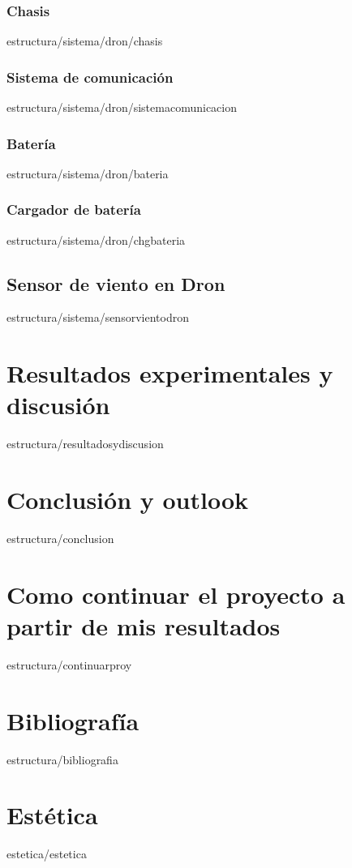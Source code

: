 \documentclass[epsbased,copyright,final,printable,covers,extendedindex,firstnumbered,tfg,gnuplot]{tfgtfmthesisuam}
\begin{document}
		\subsection{Chasis\label{SS:CHASIS}}{estructura/sistema/dron/chasis}
		\subsection{Sistema de comunicación\label{SS:SISTCOMUNICACION}}{estructura/sistema/dron/sistemacomunicacion}
		\subsection{Batería\label{SS:BATERIA}}{estructura/sistema/dron/bateria}
		\subsection{Cargador de batería\label{SS:CHGBATERIA}}{estructura/sistema/dron/chgbateria}
	\section{Sensor de viento en Dron\label{SEC:SENSORVIENTODRON}}{estructura/sistema/sensorvientodron}

\chapter{Resultados experimentales y discusión\label{CAP:RESEXPYDISC}}{estructura/resultadosydiscusion}

\chapter{Conclusión y outlook\label{CAP:CONCLUSION}}{estructura/conclusion}

\chapter{Como continuar el proyecto a partir de mis resultados\label{CAP:COTNINUARPROY}}{estructura/continuarproy}

\chapter{Bibliografía\label{CAP:BIBLIOGRAFIA}}{estructura/bibliografia}





\chapter{Estética\label{CAP:ESTETICA}}{estetica/estetica}
\end{document}
